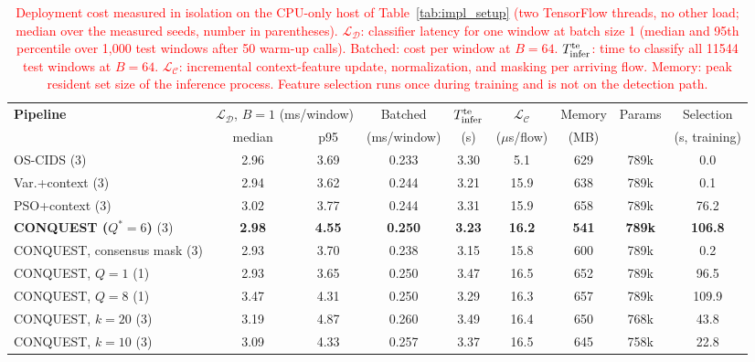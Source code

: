 \begin{table}[!t]
\centering
\caption{\textcolor{red}{Deployment cost measured in isolation on the CPU-only host of
Table~\ref{tab:impl_setup} (two TensorFlow threads, no other load; median over the measured seeds, number in
parentheses). $\mathcal{L}_{\mathcal{D}}$: classifier latency for one window at batch size 1 (median and 95th
percentile over 1{,}000 test windows after 50 warm-up calls). Batched: cost per window at $B{=}64$.
$T_{\rm infer}^{\rm te}$: time to classify all 11544 test windows at $B{=}64$. $\mathcal{L}_{\mathcal{C}}$: incremental
context-feature update, normalization, and masking per arriving flow. Memory: peak resident set size of the
inference process. Feature selection runs once during training and is not on the detection path.}}
\label{tab:latency_profile_qcids}
\color{red}
\setlength{\tabcolsep}{4pt}
\begin{tabular}{lcccccccc}
\hline\toprule
\textbf{Pipeline} & \multicolumn{2}{c}{$\mathcal{L}_{\mathcal{D}}$, $B{=}1$ (ms/window)} & Batched & $T_{\rm infer}^{\rm te}$ & $\mathcal{L}_{\mathcal{C}}$ & Memory & Params & Selection \\
 & median & p95 & (ms/window) & (s) & ($\mu$s/flow) & (MB) & & (s, training) \\
\hline\toprule
OS-CIDS (3) & 2.96 & 3.69 & 0.233 & 3.30 & 5.1 & 629 & 789k & 0.0 \\
Var.+context (3) & 2.94 & 3.62 & 0.244 & 3.21 & 15.9 & 638 & 789k & 0.1 \\
PSO+context (3) & 3.02 & 3.77 & 0.244 & 3.31 & 15.9 & 658 & 789k & 76.2 \\
\textbf{CONQUEST ($Q^{*}{=}6$)} (3) & \textbf{2.98} & \textbf{4.55} & \textbf{0.250} & \textbf{3.23} & \textbf{16.2} & \textbf{541} & \textbf{789k} & \textbf{106.8} \\
CONQUEST, consensus mask (3) & 2.93 & 3.70 & 0.238 & 3.15 & 15.8 & 600 & 789k & 0.2 \\
CONQUEST, $Q{=}1$ (1) & 2.93 & 3.65 & 0.250 & 3.47 & 16.5 & 652 & 789k & 96.5 \\
CONQUEST, $Q{=}8$ (1) & 3.47 & 4.31 & 0.250 & 3.29 & 16.3 & 657 & 789k & 109.9 \\
CONQUEST, $k{=}20$ (3) & 3.19 & 4.87 & 0.260 & 3.49 & 16.4 & 650 & 768k & 43.8 \\
CONQUEST, $k{=}10$ (3) & 3.09 & 4.33 & 0.257 & 3.37 & 16.5 & 645 & 758k & 22.8 \\
\hline\toprule
\end{tabular}
\end{table}
